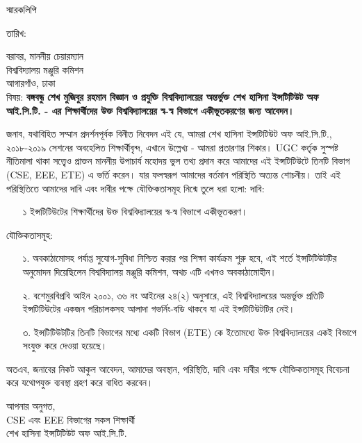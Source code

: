 \documentclass{article}
\begin{document}
\thispagestyle{empty}

\begin{center}
	\fontsize{17}{17}\selectfont স্মারকলিপি
\end{center}

\fontsize{9}{9}\selectfont %
তারিখ:  \linebreak

\vspace{1 pt}
বরাবর, \linebreak
মাননীয় চেয়ারম্যান \\
বিশ্ববিদ্যালয় মঞ্জুরি কমিশন \\
আগারগাঁও, ঢাকা \\
বিষয়:  \textbf{বঙ্গবন্ধু শেখ মুজিবুর রহমান বিজ্ঞান ও প্রযুক্তি বিশ্ববিদ্যালয়ের অন্তর্ভুক্ত শেখ হাসিনা ইন্সটিটিউট \linebreak অফ আই.সি.টি. - এর শিক্ষার্থীদের উক্ত বিশ্ববিদ্যালয়ের স্ব-স্ব বিভাগে একীভূতকরণের জন্য আবেদন।} \linebreak

\vspace{2 pt}

জনাব, \linebreak
যথাবিহিত সম্মান প্রদর্শনপূর্বক বিনীত নিবেদন এই যে, আমরা শেখ হাসিনা ইন্সটিটিউট অফ আই.সি.টি., \linebreak ২০১৮-২০১৯ সেশনের অবহেলিত শিক্ষার্থীবৃন্দ, এখানে উল্লেখ্য - আমরা প্রতারণার শিকার। UGC কর্তৃক \linebreak সুস্পষ্ট নীতিমালা থাকা সত্ত্বেও প্রাক্তন মাননীয় উপাচার্য মহোদয় ভুল তথ্য প্রদান করে আমাদের এই \linebreak ইন্সটিটিউটে তিনটি বিভাগ (CSE, EEE, ETE) এ ভর্তি করেন। যার ফলস্বরূপ আমাদের বর্তমান পরিস্থিতি \linebreak অত্যন্ত শোচনীয়। \linebreak
তাই এই পরিস্থিতিতে আমাদের দাবি এবং দাবীর পক্ষে যৌক্তিকতাসমূহ নিন্মে তুলে ধরা হলো: \linebreak
দাবি:
\begin{enumerate}
\item[১] ইন্সটিটিউটের শিক্ষার্থীদের উক্ত বিশ্ববিদ্যালয়ের স্ব-স্ব বিভাগে একীভূতকরণ।
\end{enumerate}

যৌক্তিকতাসমূহ:
\begin{enumerate}
\item[১.] অবকাঠামোসহ পর্যাপ্ত সুযোগ-সুবিধা নিশ্চিত করার পর শিক্ষা কার্যক্রম শুরু হবে, এই শর্তে \linebreak ইন্সটিটিউটটির অনুমোদন দিয়েছিলেন বিশ্ববিদ্যালয় মঞ্জুরি কমিশন, অথচ এটি এখনও অবকাঠামোহীন।
\item[২.] বশেমুরবিপ্রবি আইন ২০০১, ৩৬ নং আইনের ২৪(২) অনুসারে, এই বিশ্ববিদ্যালয়ের অন্তর্ভুক্ত প্রতিটি ইন্সটিটিউটের একজন পরিচালকসহ আলাদা গভর্নিং-বডি থাকবে যা এই ইন্সটিটিউটটির নেই।
\item[৩.] ইন্সটিটিউটটির তিনটি বিভাগের মধ্যে একটি বিভাগ (ETE) কে ইতোমধ্যে উক্ত বিশ্ববিদ্যালয়ের একই বিভাগে সংযুক্ত করে দেওয়া হয়েছে।
\end{enumerate}

অতএব, জনাবের নিকট আকুল আবেদন, আমাদের অবস্থান, পরিস্থিতি, দাবি এবং দাবীর পক্ষে যৌক্তিকতাসমূহ বিবেচনা করে যথোপযুক্ত ব্যবস্থা গ্রহণ করে বাধিত করবেন। \linebreak

\vspace{1 pt}

\fontsize{11}{11}\selectfont
আপনার অনুগত, \\
CSE এবং EEE বিভাগের সকল শিক্ষার্থী \\
শেখ হাসিনা ইন্সটিটিউট অফ আই.সি.টি.
\end{document}

